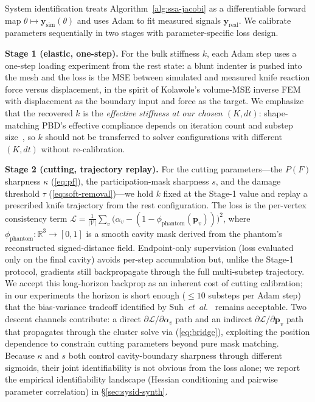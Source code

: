 \documentclass[letterpaper, 10 pt, conference]{ieeeconf}  %
\theoremstyle{tight}
\begin{document}
System identification treats Algorithm~\ref{alg:ssa-jacobi} as a
differentiable forward map
$\theta \mapsto \mathbf{y}_{\text{sim}}(\theta)$ and uses Adam to fit
measured signals $\mathbf{y}_{\text{real}}$. We calibrate parameters
sequentially in two stages with parameter-specific loss design.

\textbf{Stage 1 (elastic, one-step).} For the bulk stiffness $k$,
each Adam step uses a one-step loading experiment from the rest
state: a blunt indenter is pushed into the mesh and the loss is the
MSE between simulated and measured knife reaction force versus
displacement, in the spirit of Kolawole's volume-MSE inverse
FEM~\cite{kolawole2023} with displacement as the boundary input and
force as the target. We emphasize that the recovered $k$ is the
\emph{effective stiffness at our chosen $(K, dt)$}: shape-matching
PBD's effective compliance depends on iteration count and substep
size~\cite{macklin2016xpbd}, so $k$ should not be transferred to
solver configurations with different $(K, dt)$ without
re-calibration.

\textbf{Stage 2 (cutting, trajectory replay).} For the cutting
parameters---the $P(F)$ sharpness $\kappa$ (\ref{eq:pf}), the
participation-mask sharpness $s$, and the damage threshold $\tau$
(\ref{eq:soft-removal})---we hold $k$ fixed at the Stage-1 value and
replay a prescribed knife trajectory from the rest configuration.
The loss is the per-vertex consistency term
$\mathcal{L} \!=\! \tfrac{1}{|\mathcal{V}|}\sum_v\big(\alpha_v -
(1 - \phi_{\text{phantom}}(\mathbf{p}_v))\big)^2$,
where $\phi_{\text{phantom}}: \mathbb{R}^3 \to [0,1]$ is a smooth
cavity mask derived from the phantom's reconstructed signed-distance
field. Endpoint-only supervision (loss evaluated only on the final
cavity) avoids per-step accumulation but, unlike the Stage-1
protocol, gradients still backpropagate through the full multi-substep
trajectory. We accept this long-horizon backprop as an inherent cost
of cutting calibration; in our experiments the horizon is short
enough ($\leq\!10$ substeps per Adam step) that the
bias-variance tradeoff identified by Suh~\textit{et~al.}~\cite{suh2022}
remains acceptable.
Two descent channels contribute: a direct
$\partial\mathcal{L}/\partial\alpha_v$ path and an indirect
$\partial\mathcal{L}/\partial\mathbf{p}_v$ path that propagates
through the cluster solve via (\ref{eq:bridge}), exploiting the
position dependence to constrain cutting parameters beyond pure mask
matching. Because $\kappa$ and $s$ both control cavity-boundary
sharpness through different sigmoids, their joint identifiability is
not obvious from the loss alone; we report the empirical
identifiability landscape (Hessian conditioning and pairwise
parameter correlation) in \S\ref{sec:sysid-synth}.
\end{document}

